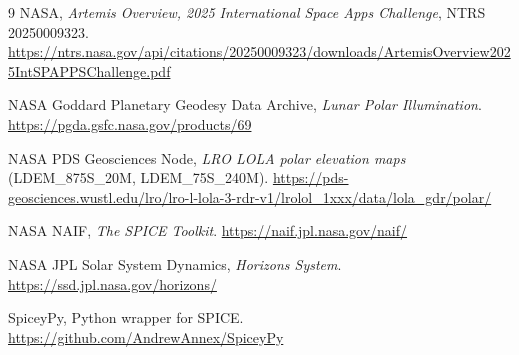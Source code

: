 \documentclass[11pt,a4paper]{article}
\begin{document}
\begin{thebibliography}{9}
NASA, \emph{Artemis Overview, 2025 International Space Apps Challenge}, NTRS 20250009323.
\url{https://ntrs.nasa.gov/api/citations/20250009323/downloads/ArtemisOverview2025IntSPAPPSChallenge.pdf}

NASA Goddard Planetary Geodesy Data Archive, \emph{Lunar Polar Illumination}.
\url{https://pgda.gsfc.nasa.gov/products/69}

NASA PDS Geosciences Node, \emph{LRO LOLA polar elevation maps} (LDEM\_875S\_20M, LDEM\_75S\_240M).
\url{https://pds-geosciences.wustl.edu/lro/lro-l-lola-3-rdr-v1/lrolol_1xxx/data/lola_gdr/polar/}

NASA NAIF, \emph{The SPICE Toolkit}.
\url{https://naif.jpl.nasa.gov/naif/}

NASA JPL Solar System Dynamics, \emph{Horizons System}.
\url{https://ssd.jpl.nasa.gov/horizons/}

SpiceyPy, Python wrapper for SPICE.
\url{https://github.com/AndrewAnnex/SpiceyPy}
\end{thebibliography}
\end{document}
